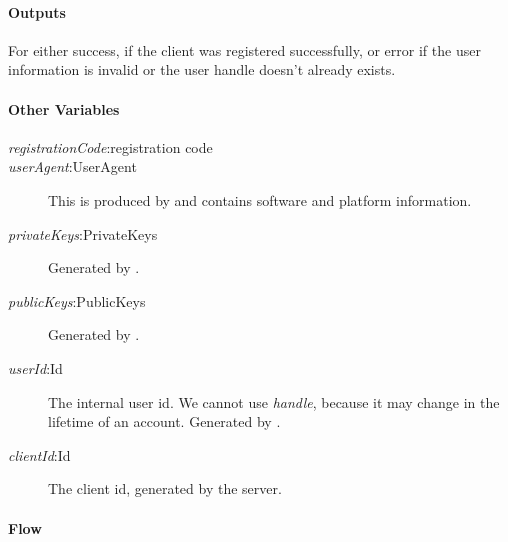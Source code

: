 \documentclass[a4paper,10pt,draft]{article}
\newcommand{\handle}{\emph{handle}}
\newcommand{\registrationCode}{\emph{registrationCode}}
\newcommand{\userAgent}{\emph{userAgent}}
\newcommand{\privateKeys}{\emph{privateKeys}}
\newcommand{\publicKeys}{\emph{publicKeys}}
\newcommand{\userId}{\emph{userId}}
\newcommand{\clientId}{\emph{clientId}}
\begin{document}
\paragraph{Outputs}
For \Client{} either success, if the client was registered successfully, or error if the user information is invalid or the user handle doesn't already exists.

\paragraph{Other Variables}
\SpecialItem
\begin{description}
 \item[\registrationCode{}:registration code]
 \item[\userAgent{}:UserAgent] This is produced by \Client{} and contains software and platform information.
 \item[\privateKeys{}:PrivateKeys] Generated by \Client{}.
 \item[\publicKeys{}:PublicKeys] Generated by \Client{}.
 \item[\userId{}:Id] The internal user id. We cannot use \handle{}, because it may change in the lifetime of an account. Generated by \Server{}.
 \item[\clientId{}:Id] The client id, generated by the server.
\end{description}

\paragraph{Flow}
\end{document}
